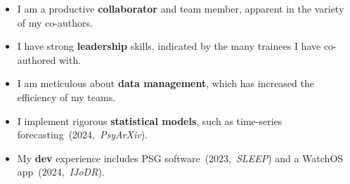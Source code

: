 \setlength{\leftmargini}{0em}
\begin{itemize}
	\setlength\itemsep{0.1em}
	\item[\faUsers] I am a productive \textbf{collaborator} and team member, apparent in the variety of my co-authors. 
	\item[\faChalkboardTeacher] I have strong \textbf{leadership} skills, indicated by the many trainees I have co-authored with.
	\item[\faDatabase] I am meticulous about \textbf{data management}, which has increased the efficiency of my teams.
	\item[\faChartArea] I implement rigorous \textbf{statistical models}, such as time-series forecasting~(2024,~\textit{PsyArXiv}).
	\item[\faTools] My \textbf{dev} experience includes PSG software~(2023,~\textit{SLEEP}) and a WatchOS app~(2024,~\textit{IJoDR}).
\end{itemize}


\vfill

\makeletterclosing



\clearpage